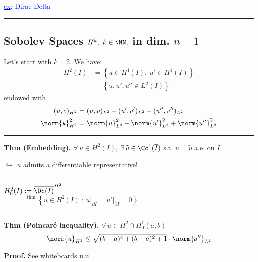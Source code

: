 \smallskip

\textcolor{blue}{\underline{ex}: Dirac Delta}

\rule{0.31\textwidth}{0.2pt}


\subsection{\color{red}Sobolev Spaces \texorpdfstring{$H^k,\ k\in\NN,$}{C} in dim. \texorpdfstring{$n=1$}{C}}


Let's start with $k=2$. We have:
\begin{align*}
H^2(I)&=\left\{ u\in H^1(I),\ u'\in H^1(I) \right\}\\&=\left\{ u,u',u''\in L^2(I) \right\}
\end{align*}
endowed with
\begin{align*}
(u,v)_{H^2}&=(u,v)_{L^2}+(u',v')_{L^2}+(u'',v'')_{L^2} \\
\norm{u}^2_{H^2}&=\norm{u}_{L^2}^2+\norm{u'}_{L^2}^2+\norm{u''}_{L^2}^2
\end{align*}

\rule{0.31\textwidth}{0.2pt}
\smallskip

\textbf{Thm (Embedding).} $\forall\,u\in H^2(I)$, $\exists\,\widetilde{u}\in\Cc^1(\overline{I})$ s.t. $u=\widetilde{u}$ a.e. on $I$

\smallskip

$\hookrightarrow$ $u$ admits a differentiable representative!

\rule{0.31\textwidth}{0.2pt}

\newcolumn 

$
H^2_0(I):=\overline{\Dc(I)}^{H^2}
$ \\
$\qquad\quad\overset{\text{thm}}{=}\left\{ u\in H^2(I)\ :\ u\big|_{\partial I}=u'\big|_{\partial I}=0 \right\}
$

\rule{0.31\textwidth}{0.2pt}
\smallskip

\textbf{Thm (Poincaré inequality).} $\forall\, u\in H^2\cap H^1_0(a,b)$
\begin{equation*}
\norm{u}_{H^2}\leq \sqrt{(b-a)^4+(b-a)^2+1}\cdot \norm{u''}_{L^2}
\end{equation*}

\textbf{\color{lavender(floral)}Proof.} See whiteboards u.u

\smallskip

